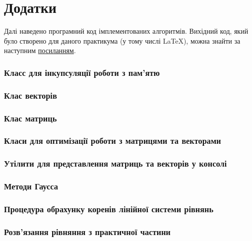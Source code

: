 \section*{\centering Додатки}



Далі наведено програмний код імплементованих алгоритмів.
Вихідний код, який було створено для даного практикума
(у тому числі \LaTeX),
можна знайти за наступним
\href{https://github.com/ShkalikovOleh/Programming-Labs}{посиланням}.

\subsubsection*{Класс для інкупсуляції роботи з пам'ятю}


\subsubsection*{Клас векторів}


\subsubsection*{Клас матриць}


\subsubsection*{Класи для оптимізації роботи з матрицями та векторами}


\subsubsection*{Утілити для представлення матриць та векторів у консолі}


\subsubsection*{Методи Гаусса}


\subsubsection*{Процедура обрахунку коренів лінійної системи рівнянь}


\subsubsection*{Розв'язання рівняння з практичної частини}
